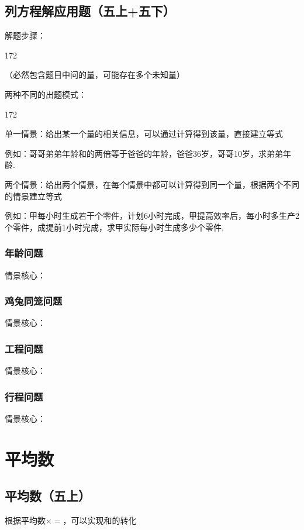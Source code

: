 \subsection*{列方程解应用题（五上+五下）}
解题步骤：
\begin{dingautolist}{172}
    \item {}（必然包含题目中问的量，可能存在多个未知量）
    \item {}
    \item {}
    \item {}
\end{dingautolist}
两种不同的出题模式：
\begin{dingautolist}{172}
    \item 单一情景：给出某一个量的相关信息，可以通过计算得到该量，直接建立等式

    例如：哥哥弟弟年龄和的两倍等于爸爸的年龄，爸爸36岁，哥哥10岁，求弟弟年龄.

    \item 两个情景：给出两个情景，在每个情景中都可以计算得到同一个量，根据两个不同的情景建立等式

    例如：甲每小时生成若干个零件，计划6小时完成，甲提高效率后，每小时多生产2个零件，成提前1小时完成，求甲实际每小时生成多少个零件.
\end{dingautolist}
\subsubsection*{年龄问题}
情景核心：
\subsubsection*{鸡兔同笼问题}
情景核心：
\subsubsection*{工程问题}
情景核心：
\subsubsection*{行程问题}
情景核心：
\section*{平均数}
\subsection*{平均数（五上）}
根据平均数$\times$$ = $，可以实现和的转化
